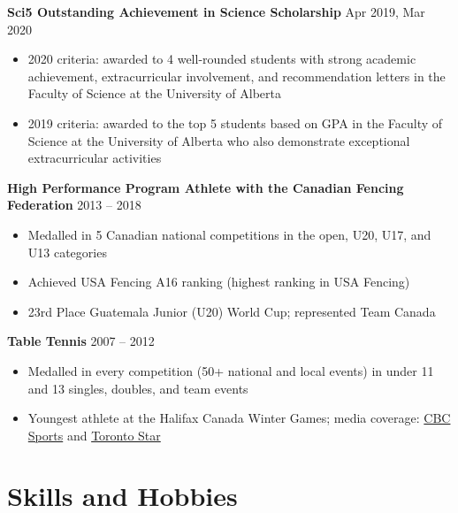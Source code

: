 \documentclass{article}
\begin{document}
\textbf{Sci5 Outstanding Achievement in Science Scholarship} \hfill Apr 2019, Mar 2020
\begin{itemize}
    \item 2020 criteria: awarded to 4 well-rounded students with strong academic achievement, extracurricular involvement, and recommendation letters in the Faculty of Science at the University of Alberta
    \item 2019 criteria: awarded to the top 5 students based on GPA in the Faculty of Science at the University of Alberta who also demonstrate exceptional extracurricular activities
\end{itemize} \vspace{1em}

\textbf{High Performance Program Athlete with the Canadian Fencing Federation} \hfill 2013 -- 2018
\begin{itemize}
    \item Medalled in 5 Canadian national competitions in the open, U20, U17, and U13 categories
    \item Achieved USA Fencing A16 ranking (highest ranking in USA Fencing)
    \item 23rd Place Guatemala Junior (U20) World Cup; represented Team Canada
\end{itemize} \vspace{1em}

\textbf{Table Tennis} \hfill 2007 -- 2012
\begin{itemize}
    \item Medalled in every competition (50+ national and local events) in under 11 and 13 singles, doubles, and team events
    \item Youngest athlete at the Halifax Canada Winter Games; media coverage: \href{https://www.cbc.ca/sports/2.723/table-tennis-player-10-turning-heads-in-halifax-1.1115785}{CBC Sports} and \href{https://www.thestar.com/sports/2011/02/22/10yearold_table_tennis_star_competes_against_pros.html}{Toronto Star}
\end{itemize}


\section*{\textcolor{my_colour}{Skills and Hobbies}}
\vspace{-.25em} \hrulefill \vspace{.25em}
\end{document}
